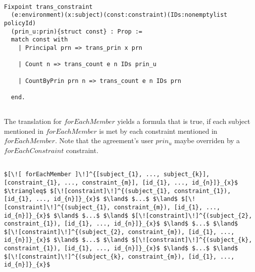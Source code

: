 \begin{lstlisting}

Fixpoint trans_constraint 
  (e:environment)(x:subject)(const:constraint)(IDs:nonemptylist policyId)
  (prin_u:prin){struct const} : Prop := 
  match const with
    | Principal prn => trans_prin x prn
  
    | Count n => trans_count e n IDs prin_u 

    | CountByPrin prn n => trans_count e n IDs prn 

  end.
  
\end{lstlisting}


The translation for $forEachMember$ yields a formula that is true, if each subject mentioned in $forEachMember$ is met by each constraint mentioned in $forEachMember$. Note that the agreement's user $prin_{u}$ maybe overriden by a $forEachConstraint$ constraint. 


\lstset{mathescape, language=AST}  
\begin{lstlisting}[frame=single, caption={ForEachMember Translation {$\colon$} Count by Principal},label={lst:transforEachMember}]

$[\![ forEachMember ]\!]^{[subject_{1}, ..., subject_{k}], [constraint_{1}, ..., constraint_{m}], [id_{1}, ..., id_{n}]}_{x}$ $\triangleq$ $[\![constraint]\!]^{(subject_{1}, constraint_{1}), [id_{1}, ..., id_{n}]}_{x}$ $\land$ $...$ $\land$ $[\![constraint]\!]^{(subject_{1}, constraint_{m}), [id_{1}, ..., id_{n}]}_{x}$ $\land$ $...$ $\land$ $[\![constraint]\!]^{(subject_{2}, constraint_{1}), [id_{1}, ..., id_{n}]}_{x}$ $\land$ $...$ $\land$ $[\![constraint]\!]^{(subject_{2}, constraint_{m}), [id_{1}, ..., id_{n}]}_{x}$ $\land$ $...$ $\land$ $[\![constraint]\!]^{(subject_{k}, constraint_{1}), [id_{1}, ..., id_{n}]}_{x}$ $\land$ $...$ $\land$ $[\![constraint]\!]^{(subject_{k}, constraint_{m}), [id_{1}, ..., id_{n}]}_{x}$ 

\end{lstlisting}

